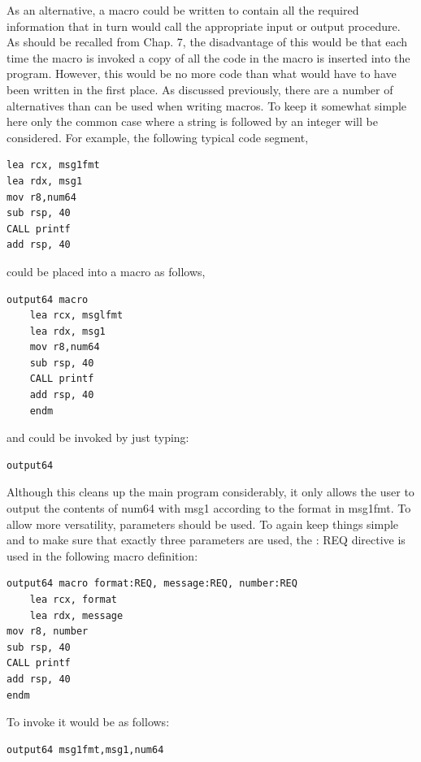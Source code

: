 \documentclass[10pt]{book}
\begin{document}
\begin{center}
\begin{center}
\begin{center}
\begin{center}
As an alternative, a macro could be written to contain all the required information that in turn would call the appropriate input or output procedure. As should be recalled from Chap. 7, the disadvantage of this would be that each time the macro is invoked a copy of all the code in the macro is inserted into the program. However, this would be no more code than what would have to have been written in the first place. As discussed previously, there are a number of alternatives than can be used when writing macros. To keep it somewhat simple here only the common case where a string is followed by an integer will be considered. For example, the following typical code segment,

\begin{verbatim}
lea rcx, msg1fmt
lea rdx, msg1
mov r8,num64
sub rsp, 40
CALL printf
add rsp, 40
\end{verbatim}

could be placed into a macro as follows,

\begin{verbatim}
output64 macro
    lea rcx, msglfmt
    lea rdx, msg1
    mov r8,num64
    sub rsp, 40
    CALL printf
    add rsp, 40
    endm
\end{verbatim}

and could be invoked by just typing:

\begin{verbatim}
output64
\end{verbatim}

Although this cleans up the main program considerably, it only allows the user to output the contents of num64 with msg1 according to the format in msg1fmt. To allow more versatility, parameters should be used. To again keep things simple and to make sure that exactly three parameters are used, the : REQ directive is used in the following macro definition:

\begin{verbatim}
output64 macro format:REQ, message:REQ, number:REQ
    lea rcx, format
    lea rdx, message
mov r8, number
sub rsp, 40
CALL printf
add rsp, 40
endm
\end{verbatim}

To invoke it would be as follows:

\begin{verbatim}
output64 msg1fmt,msg1,num64
\end{verbatim}


\end{center}
\end{center}
\end{center}
\end{center}
\end{document}
